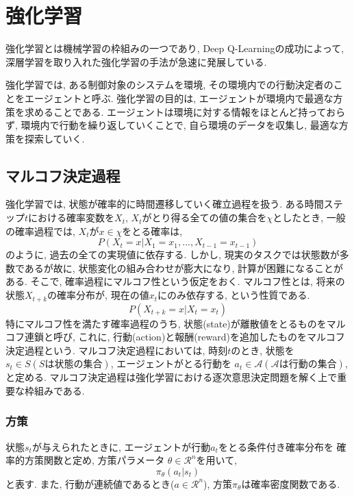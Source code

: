 \documentclass[../main]{subfiles}
\begin{document}
\newpage
\chapter{強化学習}
\label{chap:RL}
強化学習とは機械学習の枠組みの一つであり, 
Deep Q-Learning\cite{ref:dqn}の成功によって, 
深層学習を取り入れた強化学習の手法が急速に発展している.

強化学習では, ある制御対象のシステムを環境, 
その環境内での行動決定者のことをエージェントと呼ぶ.
強化学習の目的は, 
エージェントが環境内で最適な方策を求めることである.
エージェントは環境に対する情報をほとんど持っておらず, 
環境内で行動を繰り返していくことで, 
自ら環境のデータを収集し, 最適な方策を探索していく.

\section{マルコフ決定過程}
強化学習では, 状態が確率的に時間遷移していく確立過程を扱う.
ある時間ステップ$t$における確率変数を$X_t$, 
$X_t$がとり得る全ての値の集合を$\chi$としたとき, 
一般の確率過程では, $X_t$が$x\in\chi$をとる確率は, 
\begin{equation}
P(X_t=x|X_1=x_1, ... ,X_{t-1}=x_{t-1})
\end{equation}
のように, 過去の全ての実現値に依存する.
しかし, 現実のタスクでは状態数が多数であるが故に, 
状態変化の組み合わせが膨大になり, 計算が困難になることがある.
そこで, 確率過程にマルコフ性という仮定をおく.
マルコフ性とは, 将来の状態$X_{t+k}$の確率分布が, 
現在の値$x_t$にのみ依存する, という性質である.
\begin{equation}
P(X_{t+k}=x|X_t=x_t)
\end{equation}
特にマルコフ性を満たす確率過程のうち, 
状態(state)が離散値をとるものをマルコフ連鎖と呼び, 
これに, 行動(action)と報酬(reward)を追加したものをマルコフ決定過程という.
マルコフ決定過程においては, 
時刻$t$のとき, 状態を$s_t \in S(Sは状態の集合)$, 
エージェントがとる行動を
$a_t \in \mathcal{A}(\mathcal{A}は行動の集合)$, 
と定める. 
マルコフ決定過程は強化学習における逐次意思決定問題を解く上で重要な枠組みである.

\subsection{方策}
状態$s_t$が与えられたときに, 
エージェントが行動$a_t$をとる条件付き確率分布を
確率的方策関数と定め, 方策パラメータ
$\theta \in \mathcal{R}^n$を用いて, 
\begin{equation}
\pi_\theta(a_t|s_t)
\end{equation}
と表す. また, 行動が連続値であるとき($a \in \mathcal{R}^n$),
方策$\pi_\theta$は確率密度関数である.
\end{document}
